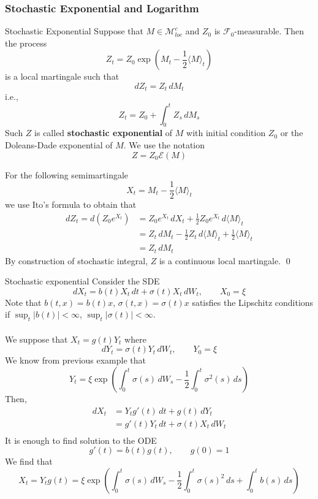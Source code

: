 \documentclass[12pt,a4paper]{article}
\renewenvironment{proof}
    {\begin{trivlist}\item[\hskip\labelsep\color{blue}\bfseries Proof:]}
    {\qed\end{trivlist}}
\begin{document}
    \subsubsection{Stochastic Exponential and Logarithm}
    \begin{proposition}{Stochastic Exponential}{}
        Suppose that $M\in\mathcal{M}^c_{loc}$ and $Z_0$ is $\mathscr{F}_0$-measurable. Then the process 
        $$
        Z_t = Z_0\exp\left(M_t -\frac{1}{2}\langle M\rangle_t\right)
        $$
        is a local martingale such that
        $$
        dZ_t = Z_t\, dM_t
        $$
        i.e., 
        $$
        Z_t = Z_0 + \int_0^t Z_s\, dM_s
        $$
        Such $Z$ is called \textbf{stochastic exponential} of $M$ with initial condition $Z_0$ or the Doleans-Dade exponential of $M$. We use the notation
        $$
        Z = Z_0 \mathcal{E}(M)
        $$
    \end{proposition}
    \begin{proof}
        For the following semimartingale
        $$
        X_t = M_t - \frac{1}{2}\langle M\rangle_t
        $$
        we use Ito's formula to obtain that 
        \begin{align*}
            dZ_t = d(Z_0 e^{X_t}) &= Z_0 e^{X_t}\, dX_t + \frac{1}{2}Z_0e^{X_t}\, d\langle M\rangle_t \\
            &= Z_t\, dM_t -\frac{1}{2}Z_t\, d\langle M\rangle_t + \frac{1}{2}\langle M\rangle_t\\
            &=Z_t\, dM_t
        \end{align*}
        By construction of stochastic integral, $Z$ is a continuous local martingale.
    \end{proof}
    \pagebreak
    \begin{example}{Stochastic exponential}{}
        Consider the SDE
        $$
        dX_t = b(t)X_t\, dt + \sigma(t) X_t \, dW_t, \qquad X_0=\xi
        $$
        Note that $b(t,x) = b(t)x$, $\sigma(t,x) = \sigma(t)x$ satisfies the Lipschitz conditions if $\sup_t|b(t)|<\infty$, $\sup_t|\sigma(t)|<\infty$.\\
        \\
        We suppose that $X_t = g(t)Y_t$ where
        $$
        dY_t = \sigma(t) Y_t\, dW_t, \qquad Y_0 = \xi
        $$
        We know from previous example that
        $$
        Y_t = \xi \exp\left(\int_0^t \sigma(s)\, dW_s -\frac{1}{2}\int_0^t \sigma^2(s)\, ds\right)
        $$
        Then,
        \begin{align*}
            dX_t & = Y_tg'(t)\, dt + g(t)\, dY_t\\
            &= g'(t)Y_t\, dt+\sigma(t)X_t\, dW_t\\
        \end{align*}
        It is enough to find solution to the ODE
        $$
        g'(t) = b(t)g(t),\qquad g(0)=1
        $$
        We find that
        $$
        X_t = Y_t g(t) = \xi\exp\left(\int_0^t \sigma(s)\, dW_s -\frac{1}{2}\int_0^t \sigma(s)^2\, ds + \int_0^t b(s)\,ds\right)
        $$
    \end{example}
\end{document}
